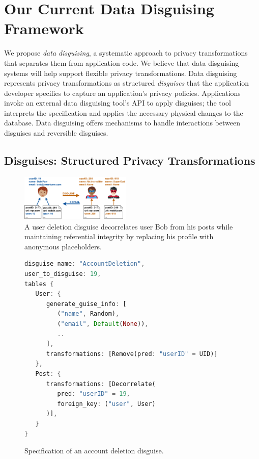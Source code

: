 \section{Our Current Data Disguising Framework}

We propose \emph{data disguising}, a systematic approach to privacy transformations
that separates them from application code.
%
We believe that data disguising systems will help support flexible privacy
transformations.
%
Data disguising represents privacy transformations as structured \emph{disguises}
that the application developer specifies to capture an application's privacy policies.
%
Applications invoke an external data disguising tool's API to apply disguises; the tool
interprets the specification and applies the necessary physical changes to the
database.
%
Data disguising offers mechanisms to handle interactions between disguises and
reversible disguises.

%
%

\subsection{Disguises: Structured Privacy Transformations}
\label{sec:disguises}

\begin{figure}[t]
    \centering
    \includegraphics[width=0.47\textwidth]{img/disguises_new}

    \caption{A user deletion disguise decorrelates user Bob from his posts while maintaining
    referential integrity by replacing his profile with anonymous placeholders.}
    \label{fig:example}
\end{figure}

\begin{figure}[t!]
    \centering
    \footnotesize
\begin{lstlisting}[language=Rust]
disguise_name: "AccountDeletion",
user_to_disguise: 19,
tables {
   User: {
      generate_guise_info: [
         ("name", Random),
         ("email", Default(None)),
         ..
      ],
      transformations: [Remove(pred: "userID" = UID)]
   },
   Post: {
      transformations: [Decorrelate(
         pred: "userID" = 19,
         foreign_key: ("user", User)
      )],
   }
}
\end{lstlisting}
    \caption{Specification of an account deletion disguise.}
    \label{fig:spec}
\end{figure}

